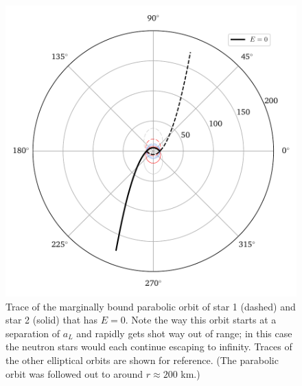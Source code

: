 \documentclass[11pt]{article}
\begin{document}
\begin{figure}[!h]
\centering
\includegraphics[scale=1]{keplerian_orbit/orbit_diagram_unbound.pdf}
\caption{\label{fig:trace_unbound} Trace of the marginally bound parabolic orbit of star 1 (dashed) and star 2 (solid) that has $E=0$. Note the way this orbit starts at a separation of $a_L$ and rapidly gets shot way out of range; in this case the neutron stars would each continue escaping to infinity. Traces of the other elliptical orbits are shown for reference. (The parabolic orbit was followed out to around $r\approx 200$ km.)}
\end{figure}
\end{document}
